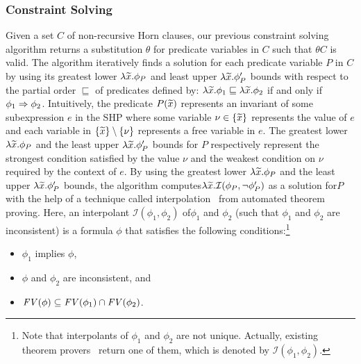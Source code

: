 \vspace{-2pt}
\subsubsection{Constraint Solving}
\label{sec:cs}

Given a set \(C\) of non-recursive Horn clauses, our previous constraint
solving algorithm returns a substitution \(\theta\) for predicate
variables in \(C\) such that \(\theta C\) is valid.
The algorithm iteratively finds a solution for each predicate variable
\(P\) in \(C\) by using its greatest lower \(\lambda \widetilde{x}.\phi_{P}\)
and least upper \(\lambda \widetilde{x}.\phi_{P}'\) bounds with respect to the
partial order \(\sqsubseteq\) of predicates defined by: \(\lambda
\widetilde{x}.\phi_1 \sqsubseteq \lambda \widetilde{x}.\phi_2\) if and only if
\(\phi_1 \Rightarrow \phi_2\).
%
Intuitively, the predicate \(P(\widetilde{x})\) represents an invariant of 
some subexpression \(e\) in the SHP where some variable \(\nu 
\in\{{\widetilde{x}}\}\) represents the value of \(e\) and each variable in 
\(\{{\widetilde{x}}\} \setminus \{{\nu}\}\) represents a free variable in \(e\). 
 The greatest lower \(\lambda\widetilde{x}.\phi_P\) and the least upper 
\(\lambda \widetilde{x}.\phi_{P}'\) bounds for \(P\) respectively represent 
the strongest condition satisfied by the value \(\nu\) and the weakest 
condition on \(\nu\) required by the context of \(e\).
%
By using the greatest lower \(\lambda \widetilde{x}.\phi_{P}\) and the least 
upper \(\lambda \widetilde{x}.\phi_{P}'\) bounds, the algorithm 
computes\(\lambda \widetilde{x}.\mathcal{I}(\phi_P,\neg \phi_P')\) as a 
solution for\(P\) with the help of a technique called 
interpolation~\cite{Henzinger2004,McMillan2005} from automated theorem 
proving.  Here, an interpolant \(\mathcal{I}(\phi_1,\phi_2)\) 
of\(\phi_1\) and \(\phi_2\) (such that \(\phi_1\) and \(\phi_2\) are 
inconsistent) is a formula \(\phi\) that satisfies the following 
conditions:\footnote{Note that interpolants of \(\phi_1\) and \(\phi_2\) 
are not unique.  Actually, existing theorem 
provers~\cite{Henzinger2004,McMillan2005,Beyer2008} return one of them, 
which is denoted by \(\mathcal{I}(\phi_1,\phi_2)\).}
\vspace{-4pt}
\begin{itemize}
\item \(\phi_1\) implies \(\phi\),
\item \(\phi\) and \(\phi_2\) are inconsistent, and
\item \(\mathit{FV}({\phi}) \subseteq \mathit{FV}({\phi_1}) \cap \mathit{FV}({\phi_2})\).
\end{itemize}

